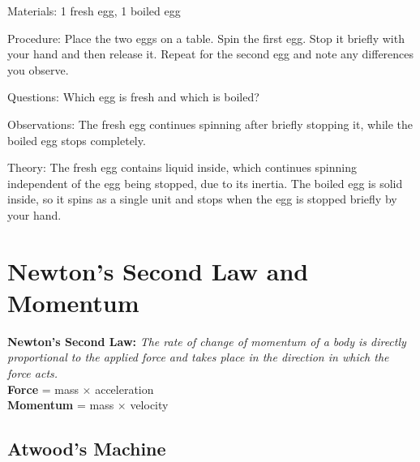 \begin{multicols}{2}
\begin{description*}
\item[Materials:]{1 fresh egg, 1 boiled egg}
\item[Procedure:]{Place the two eggs on a table. Spin the first egg. Stop it briefly with your hand and then release it. Repeat for the second egg and note any differences you observe.}
\item[Questions:]{Which egg is fresh and which is boiled?}
\item[Observations:]{The fresh egg continues spinning after briefly stopping it, while the boiled egg stops completely.}
\item[Theory:]{The fresh egg contains liquid inside, which continues spinning independent of the egg being stopped, due to its inertia. The boiled egg is solid inside, so it spins as a single unit and stops when the egg is stopped briefly by your hand.}
\end{description*}


\section*{Newton's Second Law and Momentum}
\textbf{Newton's Second Law:} \emph{The rate of change of momentum of a body is directly proportional to the applied force and takes place in the direction in which the force acts.}\\
\textbf{Force} = mass $\times$ acceleration\\
\textbf{Momentum} = mass $\times$ velocity

\subsection{Atwood's Machine}



\end{multicols}
